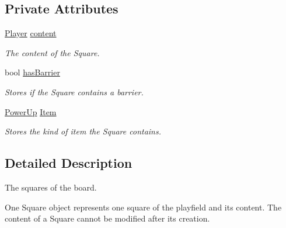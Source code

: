 \subsection*{Private Attributes}
\begin{DoxyCompactItemize}
\item 
\hypertarget{class_c_square_ac8b1e1733091b86c3c1fedfa73a1ef11}{\hyperlink{common_8hpp_a3b27da0d46d4c36bc71511bcea2db296}{Player} \hyperlink{class_c_square_ac8b1e1733091b86c3c1fedfa73a1ef11}{content}}\label{class_c_square_ac8b1e1733091b86c3c1fedfa73a1ef11}

\begin{DoxyCompactList}\small\item\em The content of the Square. \end{DoxyCompactList}\item 
\hypertarget{class_c_square_a32454efe4a8f4ac87fbc9868306560e2}{bool \hyperlink{class_c_square_a32454efe4a8f4ac87fbc9868306560e2}{has\-Barrier}}\label{class_c_square_a32454efe4a8f4ac87fbc9868306560e2}

\begin{DoxyCompactList}\small\item\em Stores if the Square contains a barrier. \end{DoxyCompactList}\item 
\hypertarget{class_c_square_a696d7dc5495225e9f48e982b3e0b221c}{\hyperlink{common_8hpp_ab119e1d9a1ae19c7528143bf1fe16c3a}{Power\-Up} \hyperlink{class_c_square_a696d7dc5495225e9f48e982b3e0b221c}{Item}}\label{class_c_square_a696d7dc5495225e9f48e982b3e0b221c}

\begin{DoxyCompactList}\small\item\em Stores the kind of item the Square contains. \end{DoxyCompactList}\end{DoxyCompactItemize}


\subsection{Detailed Description}
The squares of the board. 

One Square object represents one square of the playfield and its content. The content of a Square cannot be modified after its creation. 

